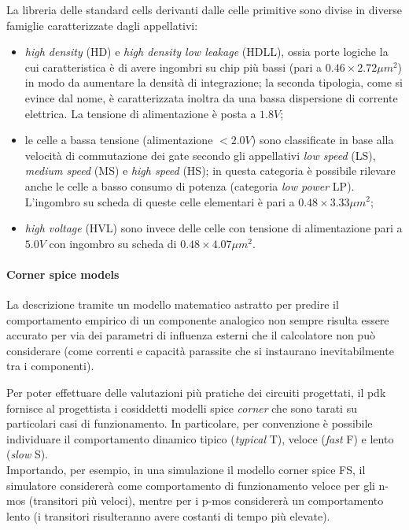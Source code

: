 		La libreria delle standard cells derivanti dalle celle primitive sono divise in diverse famiglie caratterizzate dagli appellativi:
		\begin{itemize}
			\item \textit{high density} (HD) e \textit{high density low leakage} (HDLL), ossia porte logiche la cui caratteristica è di avere ingombri su chip più bassi (pari a $0.46\times 2.72 \mu m^2$) in modo da aumentare la densità di integrazione; la seconda tipologia, come si evince dal nome, è caratterizzata inoltra da una bassa dispersione di corrente elettrica. La tensione di alimentazione è posta a $1.8V$;
			\item le celle a bassa tensione (alimentazione $<2.0V$) sono classificate in base alla velocità di commutazione dei gate secondo gli appellativi \textit{low speed} (LS), \textit{medium speed} (MS) e \textit{high speed} (HS); in questa categoria è possibile rilevare anche le celle a basso consumo di potenza (categoria \textit{low power} LP). L'ingombro su scheda di queste celle elementari è pari a $0.48\times 3.33\mu m^2$;
			\item \textit{high voltage} (HVL) sono invece delle celle con tensione di alimentazione pari a $5.0V$ con ingombro su scheda di $0.48\times 4.07 \mu m^2$.
		\end{itemize}
	
		\paragraph{Corner spice models} La descrizione tramite un modello matematico astratto per predire il comportamento empirico di un componente analogico non sempre risulta essere accurato per via dei parametri di influenza esterni che il calcolatore non può considerare (come correnti e capacità parassite che si instaurano inevitabilmente tra i componenti).
		
		Per poter effettuare delle valutazioni più pratiche dei circuiti progettati, il pdk fornisce al progettista i cosiddetti modelli spice \textit{corner} che sono tarati su particolari casi di funzionamento. In particolare, per convenzione è possibile individuare il comportamento dinamico tipico (\textit{typical} T), veloce (\textit{fast} F) e lento (\textit{slow} S).\\
		Importando, per esempio, in una simulazione il modello corner spice FS, il simulatore considererà come comportamento di funzionamento veloce per gli n-mos (transitori più veloci), mentre per i p-mos considererà un comportamento lento (i transitori risulteranno avere costanti di tempo più elevate).
		
